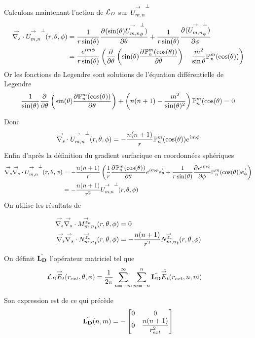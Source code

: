     Calculons maintenant l'action de \(\LD\) sur \(\Umn^\perp\)
    \begin{align*}
      \vdivs{}\Umn^\perp(\rtp) &= \frac{1}{r\sin(\theta)} \ddr{\theta}{(\sin(\theta)\Umn^\perp_\theta)} + \frac{1}{r\sin(\theta)}\ddr{\phi}{(\Umn^\perp_\phi)}
      \\
      &= \frac{e^{im\phi}}{r\sin(\theta)}
      \left(
        \ddr{\theta}{}\left(\sin(\theta)\ddr{\theta}{\Pmn(\cos(\theta))}\right) - \frac{m^2}{\sin\theta}\Pmn(\cos(\theta))
      \right)
    \end{align*}
    Or les fonctions de Legendre sont solutions de l'équation différentielle de Legendre
    \begin{align}
      \frac{1}{\sin(\theta)}\ddr{\theta}{}\left(\sin(\theta)\ddr{\theta}{\Pmn(\cos(\theta))}\right) + \left(n(n+1)-\frac{m^2}{\sin(\theta)^2}\right)\Pmn(\cos(\theta) = 0
    \end{align}

    Donc 
    \begin{align*}
       \vdivs{}\Umn^\perp(\rtp) = -\frac{n(n+1)}{r}\Pmn(\cos(\theta))e^{im\phi}
    \end{align*}
    Enfin d’après la définition du gradient surfacique en coordonnées sphériques
    \begin{align*}
       \vgrads{}\vdivs{}\Umn^\perp(\rtp) &= -\frac{n(n+1)}{r}\left(\frac{1}{r}\ddr{\theta}{\Pmn(\cos(\theta))}e^{im\phi}\vect{e_\theta}+\frac{1}{r\sin(\theta)}\ddr{\phi}{e^{im\phi}}\Pmn(\cos(\theta))\vect{e_\phi}\right)
       \\
       &=-\frac{n(n+1)}{r^2}\Umn^\perp(\rtp)
    \end{align*}
    On utilise les résultats de \cite{marceaux_high-order_2000}

    \begin{align*}
      \vgrads{}\vdivs{} \Mmn[z_n]_t(r,\theta,\phi) &= 0
      \\
      \vgrads{}\vdivs{} \Nmn[z_n]_t(r,\theta,\phi) &= -\frac{n(n+1)}{r^2}\Nmn[z_n]_t(r,\theta,\phi)
    \end{align*}

    On définit \(\hat{\mLD}\) l'opérateur matriciel tel que
    \begin{align}
      \LD \vE_t (r_{ext},\theta,\phi)
      &= \frac{1}{2\pi}\sum_{n=-\infty}^\infty\sum_{m=-n}^n \hat{\mLD} \hat{\vE_t}(r_{ext},n,m)
    \end{align}

    Son expression est de ce qui précède
    \begin{equation}
      \label{eq:cylindre:fourier:LD}
      \hat{\mLD}(n,m) = -
      \begin{bmatrix}
        0 & 0
        \\
        0 & \frac{n(n+1)}{r_{ext}^2}
      \end{bmatrix}
    \end{equation}

